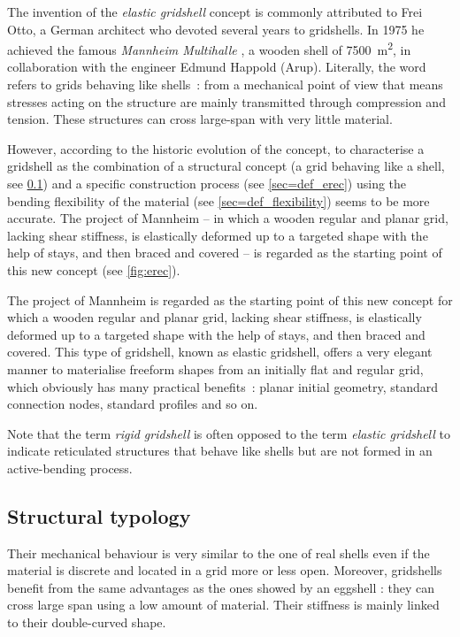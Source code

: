 The invention of the \emph{elastic gridshell} concept is commonly attributed to Frei Otto, a German architect who devoted several years to gridshells. In 1975 he achieved the famous \emph{Mannheim Multihalle} \cite{Happold1975}, a wooden shell of 7500~m\textsuperscript{2}, in collaboration with the engineer Edmund Happold (Arup).
Literally, the word  refers to grids behaving like shells~: from a mechanical point of view that means stresses acting on the structure are mainly transmitted through compression and tension. These structures can cross large-span with very little material.

However, according to the historic evolution of the concept, to characterise a gridshell as the combination of a structural concept (a grid behaving like a shell, see \cref{sec=def_topo}) and a specific construction process (see \cref{sec=def_erec}) using the bending flexibility of the material (see \cref{sec=def_flexibility}) seems to be more accurate. The project of Mannheim -- in which a wooden regular and planar grid, lacking shear stiffness, is elastically deformed up to a targeted shape with the help of stays, and then braced and covered -- is regarded as the starting point of this new concept (see \cref{fig:erec}).

The project of Mannheim is regarded as the starting point of this new concept for which a wooden regular and planar grid, lacking shear stiffness, is elastically deformed up to a targeted shape with the help of stays, and then braced and covered. This type of gridshell, known as elastic gridshell, offers a very elegant manner to materialise freeform shapes from an initially flat and regular grid, which obviously has many practical benefits~: planar initial geometry, standard connection nodes, standard profiles and so on.

Note that the term \emph{rigid gridshell} is often opposed to the term \emph{elastic gridshell} to indicate reticulated structures that behave like shells but are not formed in an active-bending process.

\subsection{Structural typology}\label{sec=def_topo}
Their mechanical behaviour is very similar to the one of real shells even if the material is discrete and located in a grid more or less open. Moreover, gridshells benefit from the same advantages as the ones showed by an eggshell : they can cross large span using a low amount of material. Their stiffness is mainly linked to their double-curved shape.

